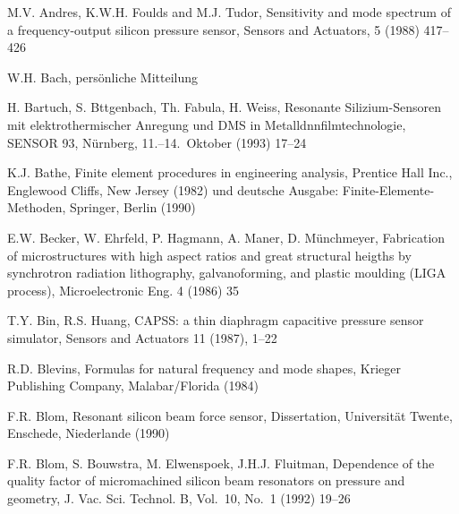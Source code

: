 \begin{thebibliography}{xxx}
 M.V. Andres, K.W.H. Foulds and M.J. Tudor,
 Sensitivity and mode spectrum of a frequency-output silicon pressure sensor,
 Sensors and Actuators, 5 (1988) 417--426



 W.H. Bach, persönliche Mitteilung

 H. Bartuch, S. Bttgenbach, Th. Fabula, H. Weiss,
 Resonante Silizium-Sensoren mit elektrothermischer Anregung und DMS in
 Metalldnnfilmtechnologie, SENSOR 93, Nürnberg, 11.--14.~Oktober (1993)
 17--24

 K.J. Bathe, Finite element procedures in engineering analysis, Prentice Hall
 Inc., Englewood Cliffs, New Jersey (1982) und deutsche Ausgabe:
 Finite-Elemente-Methoden, Springer, Berlin (1990)


 E.W. Becker, W. Ehrfeld, P. Hagmann, A. Maner, D. Münchmeyer, Fabrication of
 microstructures with high aspect ratios and great structural heigths by
 synchrotron radiation lithography, galvanoforming, and plastic moulding
 (LIGA process), Microelectronic Eng. 4 (1986) 35

 T.Y. Bin, R.S. Huang, {\sf CAPSS}: a thin diaphragm capacitive pressure
 sensor simulator, Sensors and Actuators 11 (1987), 1--22

 R.D. Blevins, Formulas for natural frequency and mode shapes,
 Krieger Publishing Company, Malabar/Florida (1984)

 F.R. Blom, Resonant silicon beam force sensor, Dissertation,
 Universität Twente, Enschede, Niederlande (1990)

 F.R. Blom, S. Bouwstra, M. Elwenspoek, J.H.J. Fluitman, Dependence of the
 quality factor of micromachined silicon beam resonators on pressure and
 geometry, J. Vac. Sci. Technol. B, Vol.~10, No.~1 (1992) 19--26


\end{thebibliography}
